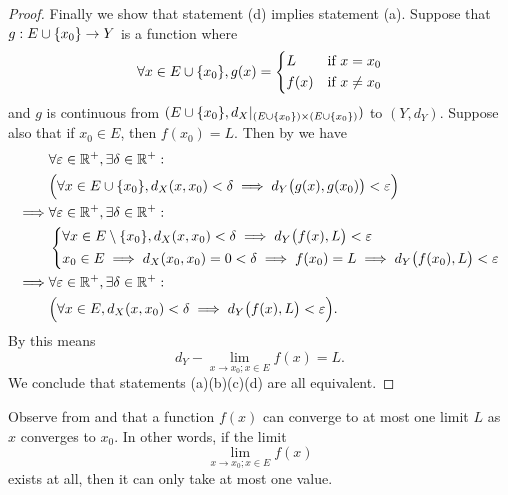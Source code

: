 \begin{proof}
  Finally we show that statement (d) implies statement (a).
  Suppose that \(g : E \cup \left\lbrace x_0\right\rbrace \to Y\) is a function where
  \[
    \forall x \in E \cup \set{x_0}, g(x) = \begin{dcases}
      L    & \text{if } x = x_0    \\
      f(x) & \text{if } x \neq x_0
    \end{dcases}
  \]
  and \(g\) is continuous from \((E \cup \set{x_0}, d_X|_{(E \cup \set{x_0}) \times (E \cup \set{x_0})})\) to \((Y, d_Y)\).
  Suppose also that if \(x_0 \in E\), then \(f(x_0) = L\).
  Then by  we have
  \begin{align*}
             & \forall \varepsilon \in \R^+, \exists \delta \in \R^+ :                                                         \\
             & \Big(\forall x \in E \cup \set{x_0}, d_X(x, x_0) < \delta \implies d_Y\big(g(x), g(x_0)\big) < \varepsilon\Big) \\
    \implies & \forall \varepsilon \in \R^+, \exists \delta \in \R^+ :                                                         \\
             & \begin{dcases}
                 \forall x \in E \setminus \set{x_0}, d_X(x, x_0) < \delta \implies d_Y\big(f(x), L\big) < \varepsilon \\
                 x_0 \in E \implies d_X(x_0, x_0) = 0 < \delta \implies f(x_0) = L \implies d_Y\big(f(x_0), L\big) < \varepsilon
               \end{dcases}  \\
    \implies & \forall \varepsilon \in \R^+, \exists \delta \in \R^+ :                                                         \\
             & \Big(\forall x \in E, d_X(x, x_0) < \delta \implies d_Y\big(f(x), L\big) < \varepsilon\Big).
  \end{align*}
  By  this means
  \[
    d_Y - \lim_{x \to x_0 ; x \in E} f(x) = L.
  \]
  We conclude that statements (a)(b)(c)(d) are all equivalent.
\end{proof}

\begin{rmk}\label{ii:3.1.6}
  Observe from  and  that a function \(f(x)\) can converge to at most one limit \(L\) as \(x\) converges to \(x_0\).
  In other words, if the limit
  \[
    \lim_{x \to x_0 ; x \in E} f(x)
  \]
  exists at all, then it can only take at most one value.
\end{rmk}

